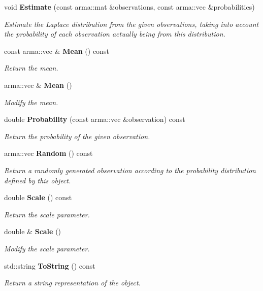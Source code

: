 \begin{DoxyCompactItemize}
void {\bf Estimate} (const arma\-::mat \&observations, const arma\-::vec \&probabilities)
\begin{DoxyCompactList}\small\item\em Estimate the Laplace distribution from the given observations, taking into account the probability of each observation actually being from this distribution. \end{DoxyCompactList}\item 
const arma\-::vec \& {\bf Mean} () const 
\begin{DoxyCompactList}\small\item\em Return the mean. \end{DoxyCompactList}\item 
arma\-::vec \& {\bf Mean} ()
\begin{DoxyCompactList}\small\item\em Modify the mean. \end{DoxyCompactList}\item 
double {\bf Probability} (const arma\-::vec \&observation) const 
\begin{DoxyCompactList}\small\item\em Return the probability of the given observation. \end{DoxyCompactList}\item 
arma\-::vec {\bf Random} () const 
\begin{DoxyCompactList}\small\item\em Return a randomly generated observation according to the probability distribution defined by this object. \end{DoxyCompactList}\item 
double {\bf Scale} () const 
\begin{DoxyCompactList}\small\item\em Return the scale parameter. \end{DoxyCompactList}\item 
double \& {\bf Scale} ()
\begin{DoxyCompactList}\small\item\em Modify the scale parameter. \end{DoxyCompactList}\item 
std\-::string {\bf To\-String} () const 
\begin{DoxyCompactList}\small\item\em Return a string representation of the object. \end{DoxyCompactList}\end{DoxyCompactItemize}
